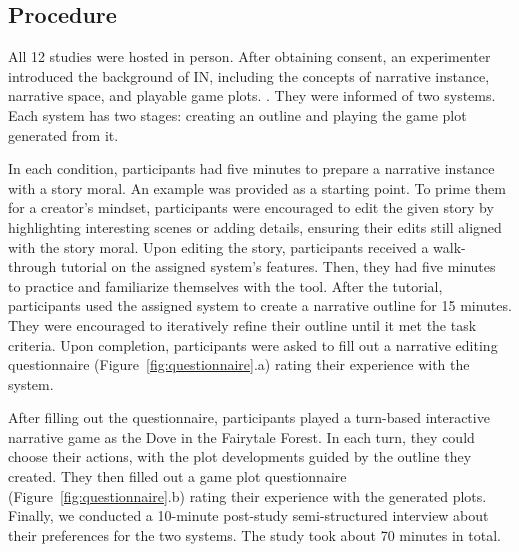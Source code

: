 \subsection{Procedure} 

All 12 studies were hosted in person. After obtaining consent, an experimenter introduced the background of IN, including the concepts of narrative instance, narrative space, and playable game plots. . They were informed of two systems. Each system has two stages: creating an outline and playing the game plot generated from it. 

In each condition, participants had five minutes to prepare a narrative instance with a story moral. An example was provided as a starting point. To prime them for a creator's mindset, participants were encouraged to edit the given story by highlighting interesting scenes or adding details, ensuring their edits still aligned with the story moral.
Upon editing the story, participants received a walk-through tutorial on the assigned system's features. Then, they had five minutes to practice and familiarize themselves with the tool. 
After the tutorial, participants used the assigned system to create a narrative outline for 15 minutes. They were encouraged to iteratively refine their outline until it met the task criteria. Upon completion, participants were asked to fill out a narrative editing questionnaire (Figure~\ref{fig:questionnaire}.a) rating their experience with the system. 

After filling out the questionnaire, participants played a turn-based interactive narrative game as the Dove in the Fairytale Forest. In each turn, they could choose their actions, with the plot developments guided by the outline they created. They then filled out a game plot questionnaire (Figure~\ref{fig:questionnaire}.b) rating their experience with the generated plots.  Finally, we conducted a 10-minute post-study semi-structured interview about their preferences for the two systems. The study took about 70 minutes in total.


